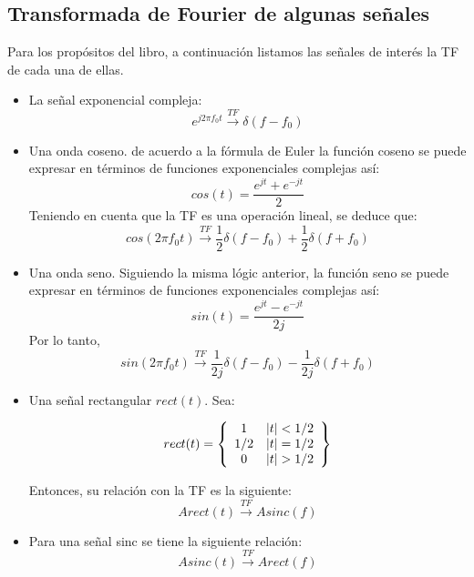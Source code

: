 \subsection{Transformada de Fourier de algunas señales}
Para los propósitos del libro, a continuación listamos las señales de interés la TF de cada una de ellas.
\begin{itemize} 
\item La señal exponencial compleja: 
\begin{equation} \label{DFTeexp}
	 e^{j2 \pi f_0t}	\xrightarrow{TF} \delta(f-f_0)			
\end{equation}
\item Una onda coseno.
de acuerdo a la fórmula de Euler la función coseno se puede expresar en términos de funciones exponenciales complejas así:
\begin{equation} \label{DFTecos}
	 cos(t)=\frac{e^{jt}+e^{-jt}}{2}
\end{equation}
Teniendo en cuenta que la TF es  una operación lineal, se deduce que:
\begin{equation} \label{DFTecos1}
	 cos(2 \pi f_0t)	\xrightarrow{TF} \frac{1}{2} \delta(f-f_0)+\frac{1}{2} \delta(f+f_0)			
\end{equation}
\item Una onda seno.
Siguiendo la misma lógic anterior, la función seno se puede expresar en términos de funciones exponenciales complejas así:
\begin{equation} \label{DFTecos2}
	 sin(t)=\frac{e^{jt}-e^{-jt}}{2j}
\end{equation}
Por lo tanto, 
\begin{equation} \label{DFTecos3}
	 sin(2 \pi f_0t)	\xrightarrow{TF} \frac{1}{2j} \delta(f-f_0)-\frac{1}{2j} \delta(f+f_0)			
\end{equation}
\item Una señal rectangular $rect(t)$. Sea:

\begin{equation} \label{equ_rect}
rect(t)=\left\lbrace 
\begin{array}{cc}
1    & \lvert t\rvert<1/2 \\
1/2  & \lvert t\rvert=1/2 \\
0    & \lvert t\rvert>1/2
\end{array}
\right\rbrace
\end{equation}

Entonces, su relación con la TF es la siguiente:
\begin{equation} \label{equ_tf_rect}
A rect(t)\xrightarrow{TF} Asinc(f)					
\end{equation}
\item Para una señal sinc se tiene la siguiente relación:
\begin{equation} \label{equ_TF_sinc}
A sinc(t)\xrightarrow{TF}  A rect(f)
\end{equation}

\end{itemize}

